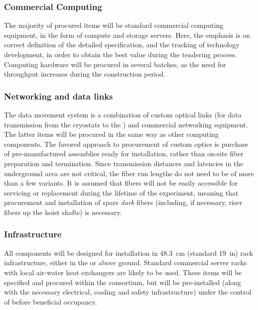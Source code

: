 \subsubsection{Commercial Computing}

The majority of procured items will be standard commercial computing equipment, in the form of compute and storage servers. Here, the emphasis is on correct definition of the detailed specification, and the tracking of technology development, in order to obtain the best value %
during the tendering process. Computing hardware will be procured in several batches, as the need for  throughput increases during the construction period. 

\subsubsection{Networking and data links}

The data movement system is a combination of custom optical links (for data transmission from the cryostats to the ) and commercial networking equipment. The latter items will be procured in the same way as other computing components. The favored approach to procurement of custom optics is purchase of pre-manufactured assemblies ready for installation, rather than %
on-site fiber preparation and termination. Since transmission distances and latencies in the underground area are not critical, the fiber run lengths do not need to be of more than a few variants. It is assumed that fibers will not be easily accessible for servicing or replacement during the lifetime of the experiment, meaning that procurement and installation of spare \textit{dark} fibers (including, if necessary, riser fibers up the \surf hoist shafts) is necessary.

\subsubsection{Infrastructure}

All  components will be designed for installation in \SI{48.3}{cm} (standard \SI{19}{in}) rack infrastructure, either in the  or above ground. Standard commercial server racks with local air-water heat exchangers are likely to be used. These items will be specified and procured within the consortium, but will be pre-installed (along with the necessary electrical, cooling and safety infrastructure) under the control of  before  beneficial occupancy.

